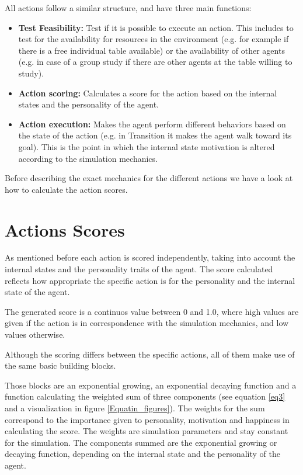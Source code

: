 All actions follow a similar structure, and have three main functions:

\begin{itemize}
    \item \textbf{Test Feasibility:} Test if it is possible to execute an action. This
    includes to test for the availability for resources in the environment
    (e.g. for example if there is a free individual table available)
    or the availability of other agents (e.g. in case of a group study if there are
    other agents at the table willing to study).
    \item \textbf{Action scoring:} Calculates a score for the action based on the
    internal states and the personality of the agent.
    \item \textbf{Action execution:} Makes the agent perform different behaviors
    based on the state of the action (e.g. in Transition it makes the agent walk toward its goal).
    This is the point in which the internal state motivation is altered according
    to the simulation mechanics.
\end{itemize}

Before describing the exact mechanics for the different actions we have a look at
how to calculate the action scores.


\pagebreak
\label{action-scores}
\section{Actions Scores}
As mentioned before each action is scored independently, taking into account the
internal states and the personality traits of the agent. The score calculated reflects
how appropriate the specific action is for the personality and the internal state
of the agent.

The generated score is a continuos value between 0 and 1.0, where high values
are given if the action is in correspondence with the simulation mechanics, and
low values otherwise.

Although the scoring differs between the specific actions, all of them make use
of the same basic building blocks.

\bb

Those blocks are an exponential growing, an exponential decaying function and a
function calculating the weighted sum of three components (see equation \ref{eq3}
and a visualization in figure \ref{Equatin_figures}). The weights for the sum correspond
to the importance given to personality, motivation and happiness in calculating the score.
The weights are simulation parameters and stay constant for the simulation. The components summed
are the exponential growing or decaying function, depending on the internal state
and the personality of the agent.


